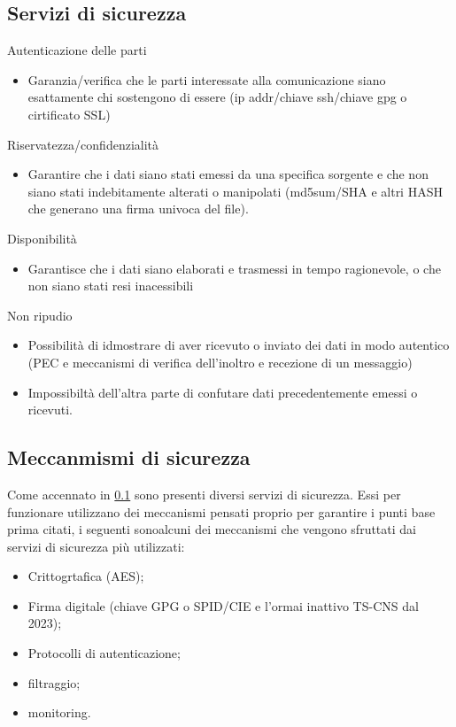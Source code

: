 \subsection{Servizi di sicurezza}
\label{sec:servdisic}
Autenticazione delle parti
\begin{itemize}
\item Garanzia/verifica che le parti interessate alla comunicazione siano esattamente chi sostengono di essere
  (ip addr/chiave ssh/chiave gpg o cirtificato SSL)
\end{itemize}
Riservatezza/confidenzialità
\begin{itemize}
\item Garantire che i dati siano stati emessi da una specifica sorgente e che non siano stati indebitamente
  alterati o manipolati (md5sum/SHA e altri HASH che generano una firma univoca del file).
\end{itemize}
Disponibilità
\begin{itemize}
\item Garantisce che i dati siano elaborati e trasmessi in tempo ragionevole, o che non siano stati resi
  inacessibili
\end{itemize}
Non ripudio
\begin{itemize}
\item Possibilità di idmostrare di aver ricevuto o inviato dei dati in modo autentico (PEC e meccanismi di
  verifica dell'inoltro e recezione di un messaggio)
\item Impossibiltà dell'altra parte di confutare dati precedentemente emessi o ricevuti.
\end{itemize}

\subsection{Meccanmismi di sicurezza}
\label{sec:mcsicurezza}

Come accennato in \ref{sec:servdisic} sono presenti diversi servizi di sicurezza. Essi per funzionare utilizzano
dei meccanismi pensati proprio per garantire i punti base prima citati, i seguenti sonoalcuni dei meccanismi
che vengono sfruttati dai servizi di sicurezza più utilizzati:
\begin{itemize}
\item Crittogrtafica (AES);
\item Firma digitale (chiave GPG o SPID/CIE e l'ormai inattivo TS-CNS dal 2023);
\item Protocolli di autenticazione;
\item filtraggio;
\item monitoring.
\end{itemize}
\clearpage
